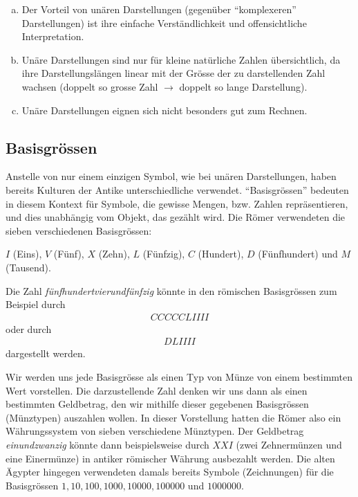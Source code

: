 \begin{myremark}\leavevmode
	\begin{enumerate}[(a)]
		\item Der Vorteil von unären Darstellungen (gegenüber \enquote{komplexeren} Darstellungen) ist ihre einfache Verständlichkeit und
		      offensichtliche Interpretation.
		\item Unäre Darstellungen sind nur für kleine natürliche Zahlen übersichtlich, da ihre Darstellungslängen linear mit der Grösse der zu
		      darstellenden Zahl wachsen (doppelt so grosse Zahl $\rightarrow$ doppelt so lange Darstellung).
		\item Unäre Darstellungen eignen sich nicht besonders gut zum Rechnen.
	\end{enumerate}
\end{myremark}

\subsection{Basisgrössen}\label{subsection:Basisgroessen}
Anstelle von nur einem einzigen Symbol, wie bei unären Darstellungen, haben bereits Kulturen der Antike unterschiedliche
 verwendet. \enquote{Basisgrössen} bedeuten in diesem Kontext für Symbole, die gewisse Mengen, bzw. Zahlen repräsentieren, und dies unabhängig vom Objekt, das gezählt wird. Die Römer verwendeten die sieben verschiedenen Basisgrössen:
\begin{center}
	$I$ (Eins), $V$ (Fünf), $X$ (Zehn), $L$ (Fünfzig), $C$ (Hundert), $D$ (Fünfhundert) und $M$ (Tausend).
\end{center}
\begin{myexample}\label{myexample:roman}
Die Zahl \textit{fünfhundertvierundfünfzig} könnte in den römischen Basisgrössen zum Beispiel durch
\begin{align*}
	CCCCCLIIII
\end{align*}
oder durch
\begin{align*}
	DLIIII
\end{align*}
dargestellt werden.
\end{myexample}
Wir werden uns jede Basisgrösse als einen Typ von Münze von einem bestimmten Wert vorstellen. Die darzustellende Zahl
denken wir uns dann als einen bestimmten Geldbetrag, den wir mithilfe dieser gegebenen Basisgrössen (Münztypen) auszahlen wollen. In
dieser Vorstellung hatten die Römer also ein Währungssystem von sieben verschiedene Münztypen. Der Geldbetrag \textit{einundzwanzig} könnte
dann beispielsweise durch $XXI$ (zwei Zehnermünzen und eine Einermünze) in antiker römischer Währung ausbezahlt werden. Die alten Ägypter hingegen verwendeten damals bereits Symbole (Zeichnungen) für die Basisgrössen $1, 10, 100, 1000, 10000,
	100000$ und $1000000$.

